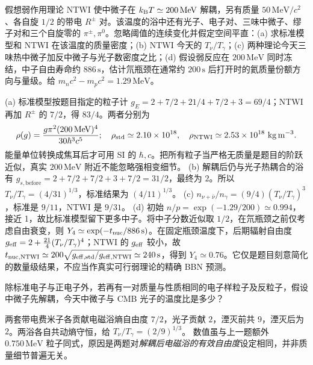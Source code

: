 \begin{exercise}
假想弱作用理论 NTWI 使中微子在 $k_{\mathrm B} T\simeq200\,\mathrm{MeV}$ 解耦，另有质量 $50\,\mathrm{MeV}/c^2$、各自旋 $1/2$ 的带电 $R^\pm$ 对。该温度的浴中还有光子、电子对、三味中微子、缪子对和三个自旋零的 $\pi^\pm,\pi^0$。忽略阈值的连续变化并假定空间平直：(a) 求标准模型和 NTWI 在该温度的质量密度；(b) NTWI 今天的 $T_\nu/T_\gamma$；(c) 两种理论今天三味热中微子加反中微子与光子数密度之比；(d) 假设弱反应在 $200\,\mathrm{MeV}$ 同时冻结，中子自由寿命约 $886\,\mathrm s$，估计氘瓶颈在通常约 $200\,\mathrm s$ 后打开时的氦质量份额方向与量级。给 $m_nc^2-m_pc^2=1.29\,\mathrm{MeV}$。
\end{exercise}
\begin{solution}
(a) 标准模型按题目指定的粒子计 $g_E=2+7/2+21/4+7/2+3=69/4$；NTWI 再加 $R^\pm$ 的 $7/2$，得 $83/4$。两者分别为
\[
\rho(g)=\frac{g\pi^2(200\,\mathrm{MeV})^4}{30\hbar^3c^5};
\quad \rho_{\rm std}\simeq2.10\times10^{18},\quad
\rho_{\rm NTWI}\simeq2.53\times10^{18}\ \mathrm{kg\,m^{-3}}.
\]
能量单位转换成焦耳后才可用 SI 的 $\hbar,c$。把所有粒子当严格无质量是题目的阶跃近似，真实 $200\,\mathrm{MeV}$ 附近不能忽略强相变细节。
(b) 解耦后仍与光子热耦合的浴有 $g_{s,\mathrm{before}}=2+7/2+7/2+3+7/2=31/2$，最终为 $2$。所以 $T_\nu/T_\gamma=(4/31)^{1/3}$，标准结果为 $(4/11)^{1/3}$。
(c) $n_{\nu+\bar\nu}/n_\gamma=(9/4)(T_\nu/T_\gamma)^3$，标准是 $9/11$，NTWI 是 $9/31$。
(d) 初始 $n/p=\exp(-1.29/200)\simeq0.994$，接近 1，故比标准模型留下更多中子。将中子分数近似取 $1/2$，在氘瓶颈之前仅考虑自由衰变，则 $Y_4\simeq\exp(-t_{\rm nuc}/886\,\mathrm s)$。在固定瓶颈温度下，后期辐射自由度 $g_{\rm eff}=2+\frac{21}4(T_\nu/T_\gamma)^4$；NTWI 的 $g_{\rm eff}$ 较小，故 $t_{\rm nuc,NTWI}\simeq200\sqrt{g_{\rm eff,std}/g_{\rm eff,NTWI}}\simeq240\,\mathrm s$，得到 $Y_4\simeq0.76$。它仅是题目刻意简化的数量级结果，不应当作真实可行弱理论的精确 BBN 预测。
\end{solution}

\begin{exercise}
除标准电子与正电子外，若再有一对质量与性质相同的电子样粒子及反粒子，假设中微子先解耦，今天中微子与 CMB 光子的温度比是多少？
\end{exercise}
\begin{solution}
两套带电费米子各贡献电磁浴熵自由度 $7/2$，光子贡献 $2$，湮灭前共 $9$，湮灭后为 $2$。两浴各自共动熵守恒，给
$T_\nu/T_\gamma=(2/9)^{1/3}$。
数值虽与上一题额外 $0.750\,\mathrm{MeV}$ 粒子同式，原因是两题对\emph{解耦后电磁浴的有效自由度}设定相同，并非质量细节普遍无关。
\end{solution}
